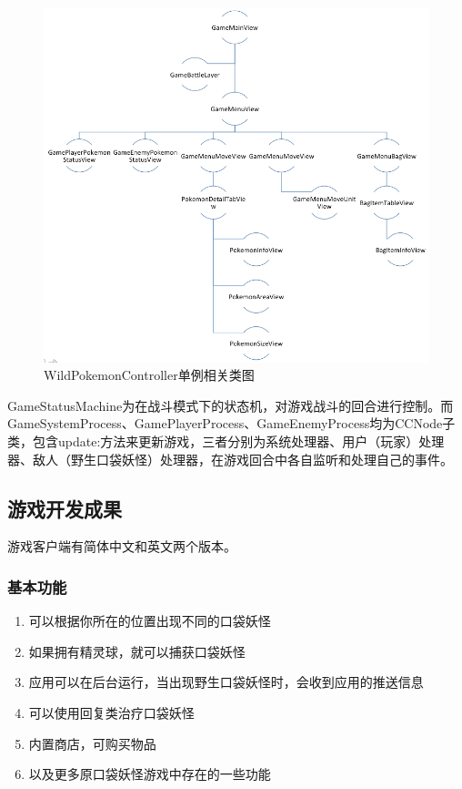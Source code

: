 \documentclass{article}
\begin{document}
\begin{CJK}{UTF8}{gbsn}
  \begin{figure}[htbp]
		\centering
		\includegraphics[bb=0 0 548 341, scale=0.45]{figure/fig_n11.png}
		\caption{WildPokemonController单例相关类图}
		\label{fig:n11}
	\end{figure}

  GameStatusMachine为在战斗模式下的状态机，对游戏战斗的回合进行控制。而GameSystemProcess、GamePlayerProcess、GameEnemyProcess均为CCNode子类，包含update:方法来更新游戏，三者分别为系统处理器、用户（玩家）处理器、敌人（野生口袋妖怪）处理器，在游戏回合中各自监听和处理自己的事件。

	\subsection{游戏开发成果}
  游戏客户端有简体中文和英文两个版本。

	\subsubsection{基本功能}

  \begin{enumerate}
    \item 可以根据你所在的位置出现不同的口袋妖怪
    \item 如果拥有精灵球，就可以捕获口袋妖怪
    \item 应用可以在后台运行，当出现野生口袋妖怪时，会收到应用的推送信息
    \item 可以使用回复类治疗口袋妖怪
    \item 内置商店，可购买物品
    \item 以及更多原口袋妖怪游戏中存在的一些功能
  \end{enumerate}


\end{CJK}
\end{document}
